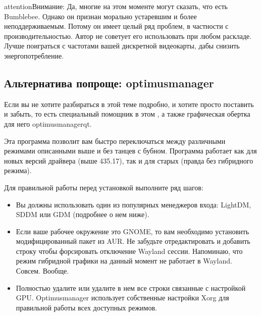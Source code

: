 \documentclass[letterpaper,10pt,russian,openany]{sphinxmanual}
\begin{document}
\begin{sphinxadmonition}{attention}{Внимание:}
\sphinxAtStartPar
Да, многие на этом моменте могут сказать, что есть Bumblebee. Однако он признан морально устаревшим
и более неподдерживаемым. Потому он имеет целый ряд проблем, в частности с производительностью. Автор не советует
его использовать при любом раскладе. Лучше поиграться с частотами вашей дискретной видеокарты, дабы снизить энергопотребление.
\end{sphinxadmonition}

\ignorespaces 

\subsection{Альтернатива попроще: optimus\sphinxhyphen{}manager}
\label{\detokenize{source/first-steps:optimus-manager}}\label{\detokenize{source/first-steps:index-15}}\label{\detokenize{source/first-steps:id14}}
\sphinxAtStartPar
Если вы не хотите разбираться в этой теме подробно, и хотите просто поставить и забыть, то
есть специальный помощник в этом \sphinxhyphen{} ,
а также графическая обертка для него optimus\sphinxhyphen{}manager\sphinxhyphen{}qt.

\sphinxAtStartPar
Эта программа позволит вам быстро переключаться между различными режимами описанными выше и без танцев с бубном.
Программа работает как для новых версий драйвера (выше 435.17), так и для старых (правда без гибридного режима).

\noindent{}

\sphinxAtStartPar
{}

\sphinxAtStartPar
Для правильной работы перед установкой выполните ряд шагов:
\begin{itemize}
\item {} 
\sphinxAtStartPar
Вы должны использовать один из популярных менеджеров входа: LightDM, SDDM или GDM (подробнее о нем ниже).

\item {} 
\sphinxAtStartPar
Если ваше рабочее окружение это GNOME, то вам необходимо установить модифицированный пакет  из AUR.
Не забудьте отредактировать  и добавить строку  чтобы форсировать отключение Wayland сессии.
Напоминаю, что режим гибридной графики на данный момент не работает в Wayland. Совсем. Вообще.

\item {} 
\sphinxAtStartPar
Полностью удалите  или удалите в нем все строки связанные с настройкой GPU.
Optimus\sphinxhyphen{}manager использует собственные настройки Xorg для правильной работы всех доступных режимов.

\end{itemize}
\end{document}
